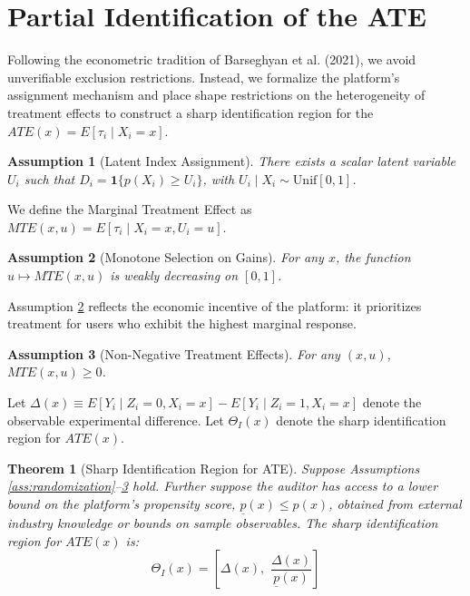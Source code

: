 \documentclass[11pt]{article}
\newtheorem{assumption}{Assumption}
\newtheorem{theorem}{Theorem}
\begin{document}
\section{Partial Identification of the ATE}
Following the econometric tradition of Barseghyan et al. (2021), we avoid unverifiable exclusion restrictions. Instead, we formalize the platform's assignment mechanism and place shape restrictions on the heterogeneity of treatment effects to construct a sharp identification region for the $ATE(x) = E[\tau_i \mid X_i=x]$.

\begin{assumption}[Latent Index Assignment]
\label{ass:latent}
There exists a scalar latent variable $U_i$ such that $D_i = \mathbf{1}\{p(X_i) \ge U_i\}$, with $U_i \mid X_i \sim \mathrm{Unif}[0,1]$.
\end{assumption}

We define the Marginal Treatment Effect as $MTE(x, u) = E[\tau_i \mid X_i=x, U_i=u]$.

\begin{assumption}[Monotone Selection on Gains]
\label{ass:monotone}
For any $x$, the function $u \mapsto MTE(x, u)$ is weakly decreasing on $[0,1]$.
\end{assumption}

Assumption \ref{ass:monotone} reflects the economic incentive of the platform: it prioritizes treatment for users who exhibit the highest marginal response.

\begin{assumption}[Non-Negative Treatment Effects]
\label{ass:nonneg}
For any $(x, u)$, $MTE(x, u) \ge 0$.
\end{assumption}

Let $\Delta(x) \equiv E[Y_i \mid Z_i=0, X_i=x] - E[Y_i \mid Z_i=1, X_i=x]$ denote the observable experimental difference. Let $\Theta_I(x)$ denote the sharp identification region for $ATE(x)$.

\begin{theorem}[Sharp Identification Region for ATE]
\label{thm:sharpbounds}
Suppose Assumptions \ref{ass:randomization}--\ref{ass:nonneg} hold. Further suppose the auditor has access to a lower bound on the platform's propensity score, $\underline{p}(x) \le p(x)$, obtained from external industry knowledge or bounds on sample observables. The sharp identification region for $ATE(x)$ is:
\begin{equation}
    \Theta_I(x) = \left[ \Delta(x), \,\, \frac{\Delta(x)}{\underline{p}(x)} \right]
\end{equation}
\end{theorem}
\end{document}
